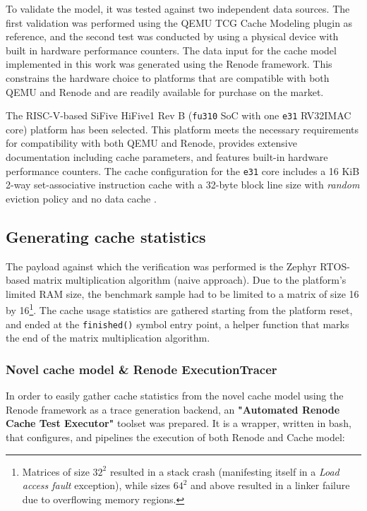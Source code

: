 To validate the model, it was tested against two independent data sources. The first validation was performed using the QEMU TCG Cache Modeling plugin as reference, and the
second test was conducted by using a physical device with built in hardware performance counters. The data input for the cache model implemented in this work was generated using
the Renode framework. This constrains the hardware choice to platforms that are compatible with both QEMU and Renode and are readily available for purchase on the market.

The RISC-V-based SiFive HiFive1 Rev B (\texttt{fu310} SoC with one \texttt{e31} RV32IMAC core) platform has been selected. This platform meets the necessary requirements for
compatibility with both QEMU and Renode, provides extensive documentation including cache parameters, and features built-in hardware performance counters.
The cache configuration for the \texttt{e31} core includes a 16 KiB 2-way set-associative instruction cache with a 32-byte block line size with \textit{random} eviction policy and
no data cache \cite{fe310docs}.

\subsection{Generating cache statistics} \label{sec:gencachestats}

The payload against which the verification was performed is the Zephyr RTOS-based matrix multiplication algorithm (naive approach). Due to the
platform's limited RAM size, the benchmark sample had to be limited to a matrix of size 16 by 16\footnote{Matrices of size $32^2$ resulted in a stack crash (manifesting itself in
a \textit{Load access fault} exception), while sizes $64^2$ and above resulted in a linker failure due to overflowing memory regions.}. The cache usage statistics are gathered
starting from the platform reset, and ended at the \texttt{finished()} symbol entry point, a helper function that marks the end of the matrix multiplication algorithm.\label{snip:measurement_window}

\subsubsection{Novel cache model \& Renode ExecutionTracer} %
In order to easily gather cache statistics from the novel cache model using the Renode framework as a trace generation backend, an \textbf{"Automated Renode Cache Test Executor"} %
toolset was prepared. It is a wrapper, written in bash, that configures, and pipelines the execution of both Renode and Cache model: %



